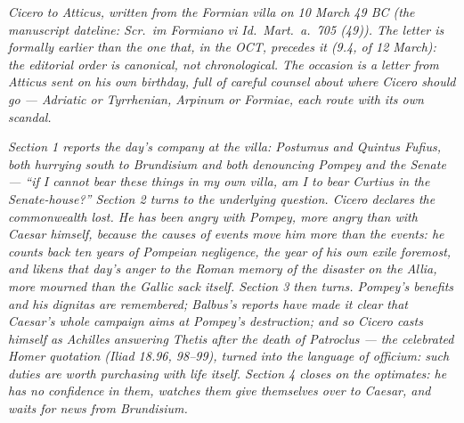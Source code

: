 
\textit{Cicero to Atticus, written from the Formian villa on
10 March 49 BC (the manuscript dateline: \textit{Scr.\ im
Formiano vi Id.\ Mart.\ a.\ 705 (49)}). The letter is
formally earlier than the one that, in the OCT, precedes
it (9.4, of 12 March): the editorial order is canonical,
not chronological. The occasion is a letter from Atticus
sent on his own birthday, full of careful counsel about
where Cicero should go --- Adriatic or Tyrrhenian, Arpinum
or Formiae, each route with its own scandal.}

\textit{Section 1 reports the day's company at the villa:
Postumus and Quintus Fufius, both hurrying south to
Brundisium and both denouncing Pompey and the Senate ---
``if I cannot bear these things in my own villa, am I to
bear Curtius in the Senate-house?'' Section 2 turns to
the underlying question. Cicero declares the
commonwealth lost. He has been angry with Pompey, more
angry than with Caesar himself, because the causes of
events move him more than the events: he counts back ten
years of Pompeian negligence, the year of his own exile
foremost, and likens that day's anger to the Roman
memory of the disaster on the Allia, more mourned than
the Gallic sack itself. Section 3 then turns. Pompey's
benefits and his \textit{dignitas} are remembered;
Balbus's reports have made it clear that Caesar's whole
campaign aims at Pompey's destruction; and so Cicero
casts himself as Achilles answering Thetis after the
death of Patroclus --- the celebrated Homer quotation
(Iliad 18.96, 98--99), turned into the language of
\textit{officium}: such duties are worth purchasing with
life itself. Section 4 closes on the optimates: he has
no confidence in them, watches them give themselves over
to Caesar, and waits for news from Brundisium.}
